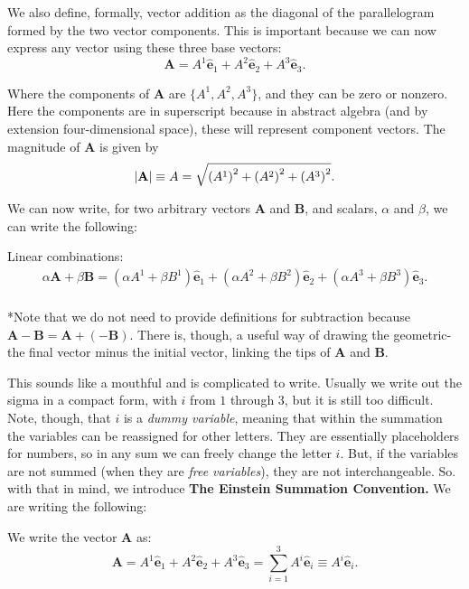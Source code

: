 \documentclass[10pt]{article}
\begin{document}
	We also define, formally, vector addition as the diagonal of the parallelogram formed by the two vector components. This is important because we can now express any vector using these three base vectors:
	\begin{equation}
	  \mathbf{A} = A^{1}\hat{\mathbf{e}}_1 + A^{2}\hat{\mathbf{e}}_2 + A^{3}\hat{\mathbf{e}}_3.
	\end{equation}

	Where the components of $\mathbf{A}$ are $\{A^{1},A^{2},A^{3}\}$, and they can be zero or nonzero. Here the components are in superscript because in abstract algebra (and by extension four-dimensional space), these will represent component vectors. The magnitude of $\mathbf{A}$ is given by
	\begin{equation}
	  \vqty{\mathbf{A}} \equiv A = \sqrt{\left( A^{1} \right)^{2} + \left( A^{2} \right)^{2} + \left( A^{3} \right)^{2}}.
	\end{equation}

	We can now write, for two arbitrary vectors $\mathbf{A}$ and $\mathbf{B}$, and scalars, $\alpha$ and $\beta$, we can write the following:
	\begin{definition}
		Linear combinations:
		\begin{equation}
		  \begin{aligned}
		  \alpha \mathbf{A} + \beta \mathbf{B} = (\alpha A^{1} + \beta B^{1})\hat{\mathbf{e}}_1 + (\alpha A^{2} + \beta B^{2})\hat{\mathbf{e}}_2 + (\alpha A^{3} + \beta B^{3})\hat{\mathbf{e}}_3. \\
		  \end{aligned}
		\end{equation}

		*Note that we do not need to provide definitions for subtraction because $\mathbf{A}-\mathbf{B} = \mathbf{A} + (-\mathbf{B})$. There is, though, a useful way of drawing the geometric- the final vector minus the initial vector, linking the tips of $\mathbf{A}$ and $\mathbf{B}$.
	\end{definition}

	This sounds like a mouthful and is complicated to write. Usually we write out the sigma in a compact form, with $i$ from $1$ through $3$, but it is still too difficult. Note, though, that $i$ is a \textit{dummy variable}, meaning that within the summation the variables can be reassigned for other letters. They are essentially placeholders for numbers, so in any sum we can freely change the letter $i$. But, if the variables are not summed (when they are \textit{free variables}), they are not interchangeable. So. with that in mind, we introduce \textbf{The Einstein Summation Convention.} We are writing the following:
	\begin{claim}
		We write the vector $\mathbf{A}$ as:
		\begin{equation}
		  \mathbf{A} = A^{1}\hat{\mathbf{e}}_1 + A^{2}\hat{\mathbf{e}}_2 + A^{3}\hat{\mathbf{e}}_3 = \sum_{i=1}^3 A^{i}\hat{\mathbf{e}}_{i} \equiv A^{i}\hat{\mathbf{e}}_{i}.
		\end{equation}
	\end{claim}
\end{document}
